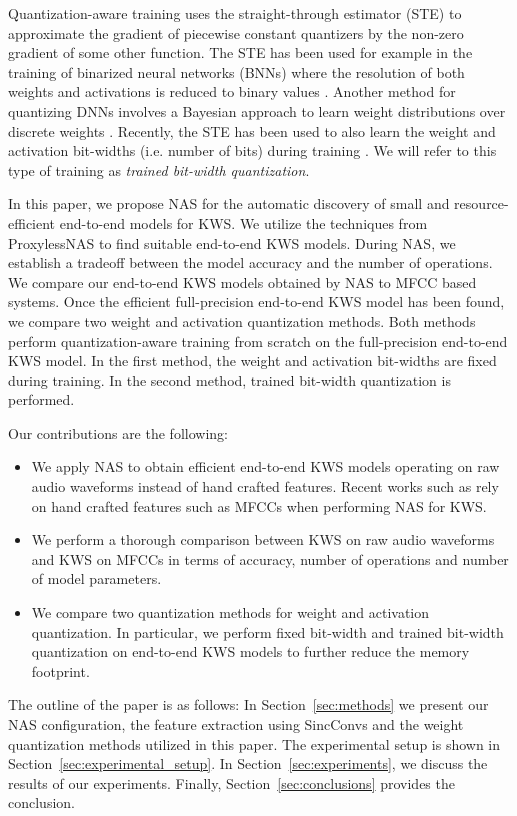 \documentclass[a4paper]{article}
\begin{document}
Quantization-aware training uses the straight-through estimator (STE) \cite{Hinton2012,Bengio2013} to approximate the gradient of piecewise constant quantizers by the non-zero gradient of some other function. The STE has been used for example in the training of binarized neural networks (BNNs) where the resolution of both weights and activations is reduced to binary values . Another method for quantizing DNNs involves a Bayesian approach to learn weight distributions over discrete weights \cite{Roth2019}. Recently, the STE has been used to also learn the weight and activation bit-widths (i.e. number of bits) during training \cite{Uhlich2020}. We will refer to this type of training as\emph{ trained bit-width quantization}.

In this paper, we propose NAS for the automatic discovery of small and resource-efficient end-to-end models for KWS. We utilize the techniques from ProxylessNAS \cite{Cai2019} to find suitable end-to-end KWS models. During NAS, we establish a tradeoff between the model accuracy and the number of operations. We compare our end-to-end KWS models obtained by NAS to MFCC based systems. Once the efficient full-precision end-to-end KWS model has been found, we compare two weight and activation quantization methods. Both methods perform quantization-aware training from scratch on the full-precision end-to-end KWS model. In the first method, the weight and activation bit-widths are fixed during training. In the second method, trained bit-width quantization is performed.

\noindent
Our contributions are the following:
\begin{itemize}
	\item We apply NAS to obtain efficient end-to-end KWS models operating on raw audio waveforms instead of hand crafted features. Recent works such as \cite{Mo2020,Zhang2020,Peter2020} rely on hand crafted features such as MFCCs when performing NAS for KWS.
	\item We perform a thorough comparison between KWS on raw audio waveforms and KWS on MFCCs in terms of accuracy, number of operations and number of model parameters.
	\item We compare two quantization methods for weight and activation quantization. In particular, we perform fixed bit-width and trained bit-width quantization on end-to-end KWS models to further reduce the memory footprint. 
\end{itemize}

The outline of the paper is as follows: In Section~\ref{sec:methods} we present our NAS configuration, the feature extraction using SincConvs and the weight quantization methods utilized in this paper. The experimental setup is shown in Section~\ref{sec:experimental_setup}. In Section~\ref{sec:experiments}, we discuss the results of our experiments. Finally, Section~\ref{sec:conclusions} provides the conclusion.
\end{document}

